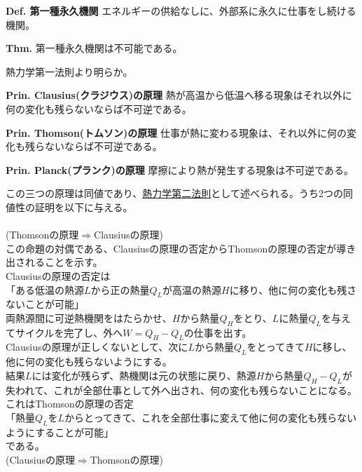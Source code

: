 \documentclass{jsarticle}
\begin{document}
\begin{itembox}[l]{\textbf{Def. 第一種永久機関}}
エネルギーの供給なしに、外部系に永久に仕事をし続ける機関。
\end{itembox}
\begin{itembox}[l]{\textbf{Thm.}}
第一種永久機関は不可能である。
\end{itembox}
熱力学第一法則より明らか。\\
\hypertarget{熱力学第二法則}{}
\begin{itembox}[l]{\textbf{Prin. Clausius(クラジウス)の原理}}
熱が高温から低温へ移る現象はそれ以外に何の変化も残らないならば不可逆である。
\end{itembox}
\begin{itembox}[l]{\textbf{Prin. Thomson(トムソン)の原理}}
仕事が熱に変わる現象は、それ以外に何の変化も残らないならば不可逆である。
\end{itembox}
\begin{itembox}[l]{\textbf{Prin. Planck(プランク)の原理}}
摩擦により熱が発生する現象は不可逆である。
\end{itembox}
この三つの原理は同値であり、\underline{熱力学第二法則}として述べられる。うち2つの同値性の証明を以下に与える。\\
\\
(Thomsonの原理\(\Longrightarrow\)Clausiusの原理)\\
この命題の対偶である、Clausiusの原理の否定からThomsonの原理の否定が導き出されることを示す。\\
Clausiusの原理の否定は\\
「ある低温の熱源\(L\)から正の熱量\(Q_{L}\)が高温の熱源\(H\)に移り、他に何の変化も残さないことが可能」\\
両熱源間に可逆熱機関をはたらかせ、\(H\)から熱量\(Q_{H}\)をとり、\(L\)に熱量\(Q_{L}\)を与えてサイクルを完了し、外へ\(W=Q_{H}-Q_{L}\)の仕事を出す。\\
Clausiusの原理が正しくないとして、次に\(L\)から熱量\(Q_{L}\)をとってきて\(H\)に移し、他に何の変化も残らないようにする。\\
結果\(L\)には変化が残らず、熱機関は元の状態に戻り、熱源\(H\)から熱量\(Q_{H}-Q_{L}\)が失われて、これが全部仕事として外へ出され、何の変化も残らないことになる。これはThomsonの原理の否定\\
「熱量\(Q_{L}\)を\(L\)からとってきて、これを全部仕事に変えて他に何の変化も残らないようにすることが可能」\\
である。\\
(Clausiusの原理\(\Longrightarrow\)Thomsonの原理)\\
\end{document}
